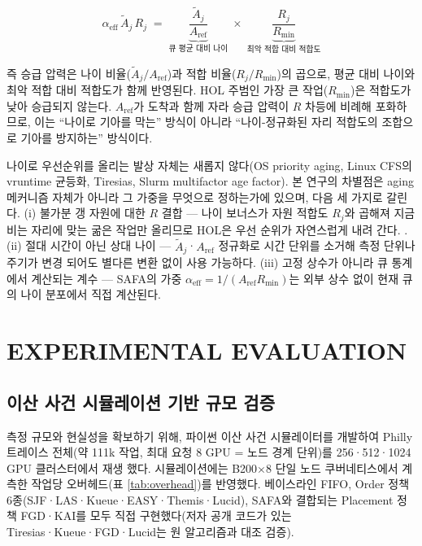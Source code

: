 \documentclass{ieeetj}
\begin{document}
\begin{equation}
\alpha_{\text{eff}}\,\tilde A_j\, R_j \;=\; \underbrace{\frac{\tilde A_j}{A_{\text{ref}}}}_{\text{큐 평균 대비 나이}} \;\times\; \underbrace{\frac{R_j}{R_{\min}}}_{\text{최악 적합 대비 적합도}}
\label{eq:alphaeff-define}
\end{equation}

즉 승급 압력은 나이 비율($\tilde A_j/A_{\text{ref}}$)과 적합 비율($R_j/R_{\min}$)의 곱으로, 평균 대비 나이와 최악 적합 대비 적합도가 함께 반영된다. HOL 주범인 가장 큰 작업($R_{\min}$)은 적합도가 낮아 승급되지 않는다. $A_{\text{ref}}$가 도착과 함께 자라 승급 압력이 $R$ 차등에 비례해 포화하므로, 이는 ``나이로 기아를 막는'' 방식이 아니라 ``나이-정규화된 자리 적합도의 조합으로 기아를 방지하는'' 방식이다.

나이로 우선순위를 올리는 발상 자체는 새롭지 않다(OS priority aging, Linux CFS의 vruntime 균등화, Tiresias\cite{gu2019tiresias}, Slurm multifactor age factor). 본 연구의 차별점은 aging 메커니즘 자체가 아니라 그 가중을 무엇으로 정하는가에 있으며, 다음 세 가지로 갈린다. (i) 불가분 갱 자원에 대한 $R$ 결합 --- 나이 보너스가 자원 적합도 $R_j$와 곱해져 지금 비는 자리에 맞는 굶은 작업만 올리므로 HOL은 우선 순위가 자연스럽게 내려 간다. . (ii) 절대 시간이 아닌 상대 나이 --- $\tilde A_j$·$A_{\text{ref}}$ 정규화로 시간 단위를 소거해 측정 단위나 주기가 변경 되어도 별다른 변환 없이 사용 가능하다. (iii) 고정 상수가 아니라 큐 통계에서 계산되는 계수 --- SAFA의 가중 $\alpha_{\text{eff}}=1/(A_{\text{ref}}R_{\min})$는 외부 상수 없이 현재 큐의 나이 분포에서 직접 계산된다. 

\section{EXPERIMENTAL EVALUATION}\label{sec:eval}

\subsection{이산 사건 시뮬레이션 기반 규모 검증}\label{eval:sim}
측정 규모와 현실성을 확보하기 위해, 파이썬 이산 사건 시뮬레이터를 개발하여 Philly 트레이스\cite{jeon2019philly} 전체(약 111k 작업, 최대 요청 8 GPU = 노드 경계 단위)를 256·512·1024 GPU 클러스터에서 재생 했다. 시뮬레이션에는 B200$\times$8 단일 노드 쿠버네티스에서 계측한 작업당 오버헤드(표 \ref{tab:overhead})를 반영했다. 베이스라인 FIFO, Order 정책 6종(SJF·LAS·Kueue·EASY·Themis·Lucid), SAFA와 결합되는 Placement 정책 FGD·KAI를 모두 직접 구현했다(저자 공개 코드가 있는 Tiresias·Kueue·FGD·Lucid는 원 알고리즘과 대조 검증).
\end{document}
